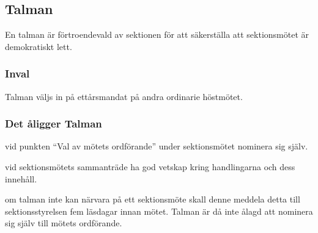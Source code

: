 \subsection{Talman}
En talman är förtroendevald av sektionen för att säkerställa att sektionsmötet är demokratiskt lett. 

\subsubsection{Inval}
Talman väljs in på ettårsmandat på andra ordinarie höstmötet.
\subsubsection{Det åligger Talman}
\begin{att}
  \item vid punkten ``Val av mötets ordförande'' under sektionsmötet nominera sig själv.
  \item vid sektionsmötets sammanträde ha god vetskap kring handlingarna och dess innehåll.
  \item om talman inte kan närvara på ett sektionsmöte skall denne meddela detta till sektionsstyrelsen fem läsdagar innan mötet. Talman är då inte ålagd att nominera sig själv till mötets ordförande.
\end{att}